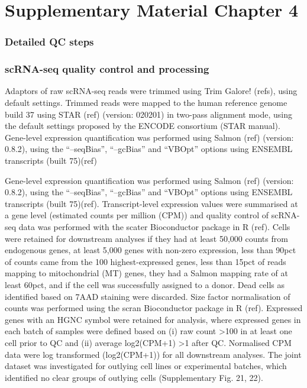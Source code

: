 \chapter{Supplementary Material Chapter 4} 

\subsection*{Detailed QC steps}

\subsection*{scRNA-seq quality control and processing}

Adaptors of raw scRNA-seq reads were trimmed using Trim Galore! (refs), using default settings. Trimmed reads were mapped to the human reference genome build 37 using STAR (ref) (version: 020201) in two-pass alignment mode, using the default settings proposed by the ENCODE consortium (STAR manual). Gene-level expression quantification was performed using Salmon (ref) (version: 0.8.2), using the “--seqBias”, “--gcBias” and “VBOpt” options using ENSEMBL transcripts (built 75)(ref)

Gene-level expression quantification was performed using Salmon (ref) (version: 0.8.2), using the “--seqBias”, “--gcBias” and “VBOpt” options using ENSEMBL transcripts (built 75)(ref). Transcript-level expression values were summarised at a gene level (estimated counts per million (CPM)) and quality control of scRNA-seq data was performed with the scater Bioconductor package in R (ref). Cells were retained for downstream analyses if they had at least 50,000 counts from endogenous genes, at least 5,000 genes with non-zero expression, less than 90pct of counts came from the 100 highest-expressed genes, less than 15pct of reads mapping to mitochondrial (MT) genes, they had a Salmon mapping rate of at least 60pct, and if the cell was successfully assigned to a donor. Dead cells as identified based on 7AAD staining were discarded. Size factor normalisation of counts was performed using the scran Bioconductor package in R (ref). Expressed genes with an HGNC symbol were retained for analysis, where expressed genes in each batch of samples were defined based on (i) raw count >100 in at least one cell prior to QC and (ii) average log2(CPM+1) >1 after QC. Normalised CPM data were log transformed (log2(CPM+1)) for all downstream analyses. The joint dataset was investigated for outlying cell lines or experimental batches, which identified no clear groups of outlying cells (Supplementary Fig. 21, 22). 


